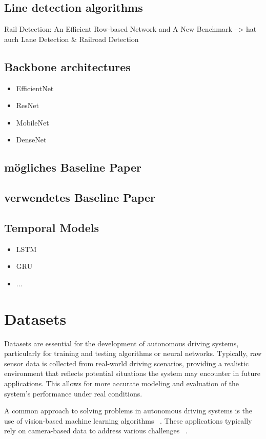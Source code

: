 \subsection{Line detection algorithms}
Rail Detection: An Efficient Row-based Network and A New Benchmark --> hat auch Lane Detection \& Railroad Detection
\subsection{Backbone architectures}

\begin{itemize}
    \item EfficientNet
    \item ResNet
    \item MobileNet
    \item DenseNet
\end{itemize}

\subsection{mögliches Baseline Paper}
\subsection{verwendetes Baseline Paper}
\subsection{Temporal Models}

\begin{itemize}
    \item LSTM
    \item GRU
    \item ...
\end{itemize}

\section{Datasets}

Datasets are essential for the development of autonomous driving systems, particularly for training and testing algorithms or neural networks. Typically, raw sensor data is collected from real-world driving scenarios, providing a realistic environment that reflects potential situations the system may encounter in future applications. This allows for more accurate modeling and evaluation of the system's performance under real conditions.

A common approach to solving problems in autonomous driving systems is the use of vision-based machine learning algorithms ~\cite[S.~1221]{railsem19dataset}. These applications typically rely on camera-based data to address various challenges ~\cite[S.~1221]{railsem19dataset}.

